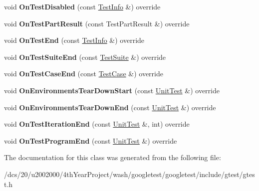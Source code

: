 \begin{DoxyCompactItemize}
\item 
\mbox{\label{classtesting_1_1EmptyTestEventListener_a200fee280ddf30644aa5b1056edc2563}} 
void {\bfseries On\+Test\+Disabled} (const \mbox{\hyperlink{classtesting_1_1TestInfo}{Test\+Info}} \&) override
\item 
\mbox{\label{classtesting_1_1EmptyTestEventListener_ab95992f0a0b3741d59a24c3a7115fa60}} 
void {\bfseries On\+Test\+Part\+Result} (const Test\+Part\+Result \&) override
\item 
\mbox{\label{classtesting_1_1EmptyTestEventListener_a709d7077c086c877d214231bc520ef90}} 
void {\bfseries On\+Test\+End} (const \mbox{\hyperlink{classtesting_1_1TestInfo}{Test\+Info}} \&) override
\item 
\mbox{\label{classtesting_1_1EmptyTestEventListener_aefdb73682d290791461e186d864db718}} 
void {\bfseries On\+Test\+Suite\+End} (const \mbox{\hyperlink{classtesting_1_1TestSuite}{Test\+Suite}} \&) override
\item 
\mbox{\label{classtesting_1_1EmptyTestEventListener_abe05cc74c1081ed51e2c84b73013299e}} 
void {\bfseries On\+Test\+Case\+End} (const \mbox{\hyperlink{classtesting_1_1TestSuite}{Test\+Case}} \&) override
\item 
\mbox{\label{classtesting_1_1EmptyTestEventListener_a320780451eac9178434b7c77d948ecbd}} 
void {\bfseries On\+Environments\+Tear\+Down\+Start} (const \mbox{\hyperlink{classtesting_1_1UnitTest}{Unit\+Test}} \&) override
\item 
\mbox{\label{classtesting_1_1EmptyTestEventListener_ad9984052e82c3ae26395a2d9480326d2}} 
void {\bfseries On\+Environments\+Tear\+Down\+End} (const \mbox{\hyperlink{classtesting_1_1UnitTest}{Unit\+Test}} \&) override
\item 
\mbox{\label{classtesting_1_1EmptyTestEventListener_aae9c5c61e476f0c421402fb1dde434d2}} 
void {\bfseries On\+Test\+Iteration\+End} (const \mbox{\hyperlink{classtesting_1_1UnitTest}{Unit\+Test}} \&, int) override
\item 
\mbox{\label{classtesting_1_1EmptyTestEventListener_aaa9d683e8e0c850af67a0b92d785ddb9}} 
void {\bfseries On\+Test\+Program\+End} (const \mbox{\hyperlink{classtesting_1_1UnitTest}{Unit\+Test}} \&) override
\end{DoxyCompactItemize}


The documentation for this class was generated from the following file\+:\begin{DoxyCompactItemize}
\item 
/dcs/20/u2002000/4th\+Year\+Project/wash/googletest/googletest/include/gtest/gtest.\+h\end{DoxyCompactItemize}
